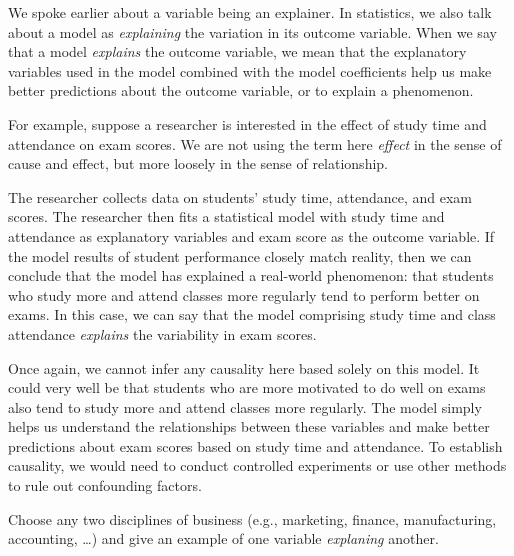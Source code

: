 \documentclass[
  12pt,
  letterpaper,
  DIV=11,
  numbers=noendperiod]{scrreprt}
\begin{document}
We spoke earlier about a variable being an explainer. In statistics, we
also talk about a model as \emph{explaining} the variation in its
outcome variable. When we say that a model \emph{explains} the outcome
variable, we mean that the explanatory variables used in the model
combined with the model coefficients help us make better predictions
about the outcome variable, or to explain a phenomenon.

For example, suppose a researcher is interested in the effect of study
time and attendance on exam scores. We are not using the term here
\emph{effect} in the sense of cause and effect, but more loosely in the
sense of relationship.

The researcher collects data on students' study time, attendance, and
exam scores. The researcher then fits a statistical model with study
time and attendance as explanatory variables and exam score as the
outcome variable. If the model results of student performance closely
match reality, then we can conclude that the model has explained a
real-world phenomenon: that students who study more and attend classes
more regularly tend to perform better on exams. In this case, we can say
that the model comprising study time and class attendance
\emph{explains} the variability in exam scores.

\begin{tcolorbox}[enhanced jigsaw, colback=white, leftrule=.75mm, toprule=.15mm, bottomtitle=1mm, breakable, coltitle=black, toptitle=1mm, title=\textcolor{quarto-callout-important-color}{\faExclamation}\hspace{0.5em}{Important}, opacitybacktitle=0.6, colbacktitle=quarto-callout-important-color!10!white, arc=.35mm, left=2mm, colframe=quarto-callout-important-color-frame, titlerule=0mm, rightrule=.15mm, bottomrule=.15mm, opacityback=0]

Once again, we cannot infer any causality here based solely on this
model. It could very well be that students who are more motivated to do
well on exams also tend to study more and attend classes more regularly.
The model simply helps us understand the relationships between these
variables and make better predictions about exam scores based on study
time and attendance. To establish causality, we would need to conduct
controlled experiments or use other methods to rule out confounding
factors.

\end{tcolorbox}

\begin{tcolorbox}[enhanced jigsaw, colback=white, leftrule=.75mm, toprule=.15mm, bottomtitle=1mm, breakable, coltitle=black, toptitle=1mm, title={Quick Check}, opacitybacktitle=0.6, colbacktitle=quarto-callout-note-color!10!white, arc=.35mm, left=2mm, colframe=quarto-callout-note-color-frame, titlerule=0mm, rightrule=.15mm, bottomrule=.15mm, opacityback=0]

Choose any two disciplines of business (e.g., marketing, finance,
manufacturing, accounting, \ldots) and give an example of one variable
\emph{explaning} another.

\end{tcolorbox}
\end{document}
